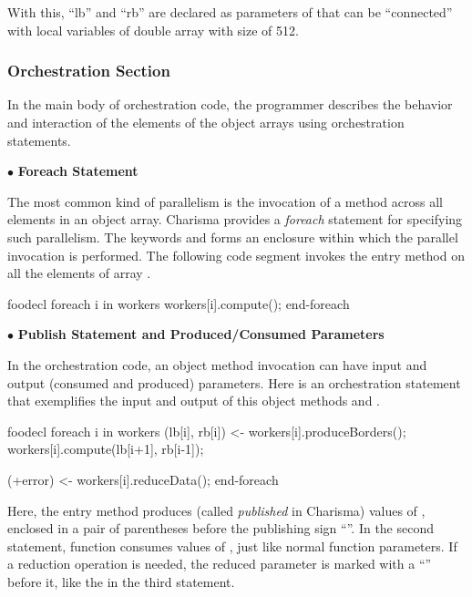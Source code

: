 With this, ``lb'' and ``rb'' are declared as parameters of that can be 
``connected'' with local variables of double array with size of 512. 

\subsubsection{Orchestration Section}
\label{sec:orchsec}

In the main body of orchestration code, the programmer describes the behavior
and interaction of the elements of the object arrays using orchestration
statements.

$\bullet$ {\bf Foreach Statement}

The most common kind of parallelism is the invocation of a method
across all elements in an object array. Charisma provides a {\em foreach}
statement for specifying such parallelism. The keywords  and
 forms an enclosure within which the parallel invocation is
performed. The following code segment invokes the entry method  on
all the elements of array . 

\begin{SaveVerbatim}{foodecl}
  foreach i in workers
    workers[i].compute();
  end-foreach
\end{SaveVerbatim}
\vspace{0.1in}
\vspace{0.1in}

$\bullet$ {\bf Publish Statement and Produced/Consumed Parameters}

In the orchestration code, an object method invocation can have input and output
(consumed and produced) parameters. Here is an orchestration statement that
exemplifies the input and output of this object methods
 and . 

\begin{SaveVerbatim}{foodecl}
  foreach i in workers
    (lb[i], rb[i]) <- workers[i].produceBorders();
    workers[i].compute(lb[i+1], rb[i-1]);
    
    (+error) <- workers[i].reduceData();
  end-foreach
\end{SaveVerbatim}
\vspace{0.1in}
\vspace{0.1in}

Here, the entry method  produces (called {\em
published} in Charisma) values of , enclosed in a pair of
parentheses before the publishing sign ``\code{<-}''. In the second
statement, function  consumes values of , just like normal function parameters. If a reduction operation is
needed, the reduced parameter is marked with a ``\code{+}'' before it, like the
 in the third statement. 

